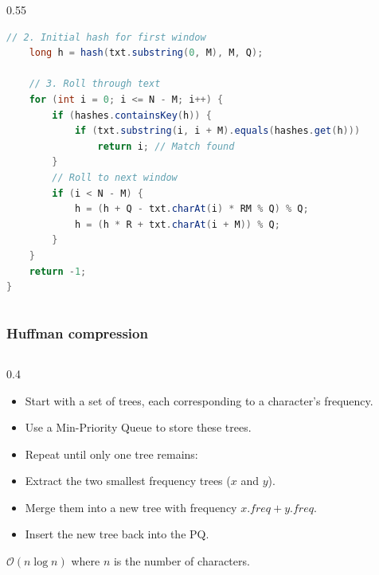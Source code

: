 \documentclass[8pt,aspectratio=169]{beamer}
\begin{document}
\begin{frame}[fragile]
\begin{columns}[T]
\begin{column}{0.55\textwidth}
\begin{lstlisting}[language=Java, basicstyle=\tiny\ttfamily, keywordstyle=\color{blue}, frame=single]
    // 2. Initial hash for first window
    long h = hash(txt.substring(0, M), M, Q);

    // 3. Roll through text
    for (int i = 0; i <= N - M; i++) {
        if (hashes.containsKey(h)) {
            if (txt.substring(i, i + M).equals(hashes.get(h)))
                return i; // Match found
        }
        // Roll to next window
        if (i < N - M) {
            h = (h + Q - txt.charAt(i) * RM % Q) % Q;
            h = (h * R + txt.charAt(i + M)) % Q;
        }
    }
    return -1;
}
    \end{lstlisting}
    \end{column}
\end{columns}

\end{frame}


\begin{frame}[fragile]
\frametitle{Huffman compression}
\begin{columns}[T]
    \begin{column}{0.4\textwidth}
        \begin{itemize}
            \item Start with a set of trees, each corresponding to a character's frequency.
            \item Use a Min-Priority Queue to store these trees.
            \item Repeat until only one tree remains:
            \item Extract the two smallest frequency trees ($x$ and $y$).
            \item Merge them into a new tree with frequency $x.freq + y.freq$.
            \item Insert the new tree back into the PQ.
        \end{itemize}
        \vspace{1em}
        $\mathcal{O}(n \log n)$ where $n$ is the number of characters.
    \end{column}


\end{columns}
\end{frame}
\end{document}
